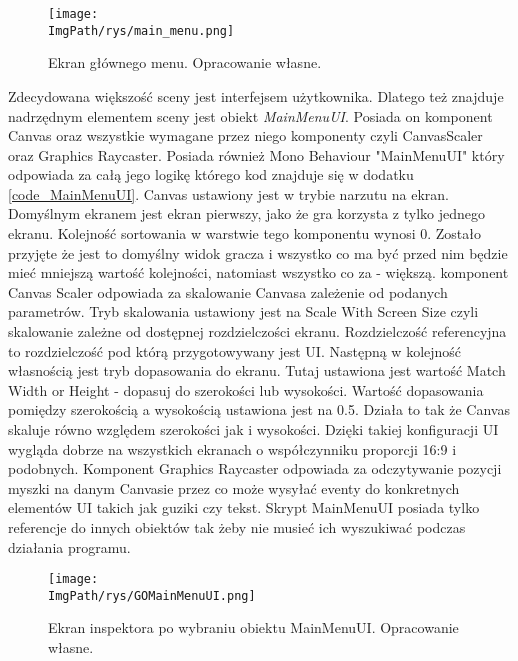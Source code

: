 \documentclass[a4paper,12pt,twoside,openany]{report}
\newcommand{\ImgPath}{.}
\begin{document}
\begin{figure}[!htbp]
	\begin{center}
\centering
\texttt{[image: \\ImgPath/rys/main\_menu.png]}
\end{center}
	\caption{Ekran głównego menu. Opracowanie własne.}
	\label{main_menu}
\end{figure}

Zdecydowana większość sceny jest interfejsem użytkownika. Dlatego też znajduje nadrzędnym elementem sceny jest obiekt \textit{MainMenuUI}. Posiada on komponent Canvas oraz wszystkie wymagane przez niego komponenty czyli CanvasScaler oraz Graphics Raycaster. Posiada również Mono Behaviour "MainMenuUI"  który odpowiada za całą jego logikę którego kod znajduje się w dodatku \ref{code_MainMenuUI}. Canvas ustawiony jest w trybie narzutu na ekran. Domyślnym ekranem jest ekran pierwszy, jako że gra korzysta z tylko jednego ekranu. Kolejność sortowania w warstwie tego komponentu wynosi 0. Zostało przyjęte że jest to domyślny widok gracza i wszystko co ma być przed nim będzie mieć mniejszą wartość kolejności, natomiast wszystko co za  - większą. komponent Canvas Scaler odpowiada za skalowanie Canvasa zależenie od podanych parametrów. Tryb skalowania ustawiony jest na Scale With Screen Size czyli skalowanie zależne od dostępnej rozdzielczości ekranu. Rozdzielczość referencyjna to rozdzielczość pod którą przygotowywany jest UI. Następną w kolejność własnością jest tryb dopasowania do ekranu. Tutaj ustawiona jest wartość Match Width or Height - dopasuj do szerokości lub wysokości. Wartość dopasowania pomiędzy szerokością a wysokością ustawiona jest na 0.5. Działa to tak że Canvas skaluje równo względem szerokości jak i wysokości. Dzięki takiej konfiguracji UI wygląda dobrze na wszystkich ekranach o współczynniku proporcji 16:9 i podobnych. Komponent Graphics Raycaster odpowiada za odczytywanie pozycji myszki na danym Canvasie przez co może wysyłać eventy do konkretnych elementów UI takich jak guziki czy tekst. Skrypt MainMenuUI posiada tylko referencje do innych obiektów tak żeby nie musieć ich wyszukiwać podczas działania programu. 

\begin{figure}[H]
	\begin{center}
\centering
\texttt{[image: \\ImgPath/rys/GOMainMenuUI.png]}
\end{center}
	\caption{Ekran inspektora po wybraniu obiektu MainMenuUI. Opracowanie własne.}
	\label{GOMainMenuUI}
\end{figure}
\end{document}
